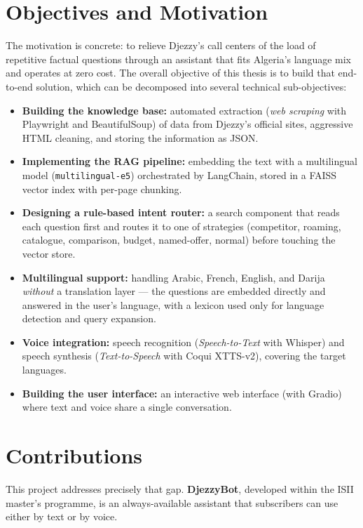 \documentclass[12pt, a4paper]{report}
\newcommand{\humantext}[1]{#1}      %
\begin{document}
\section*{Objectives and Motivation}
\humantext{The motivation is concrete: to relieve Djezzy's call centers of the load of repetitive factual questions through an assistant that fits Algeria's language mix and operates at zero cost. The overall objective of this thesis is to build that end-to-end solution, which can be decomposed into several technical sub-objectives:}
\begin{itemize}
    \item \humantext{\textbf{Building the knowledge base:} automated extraction (\textit{web scraping} with Playwright and BeautifulSoup) of data from Djezzy's official sites, aggressive HTML cleaning, and storing the information as JSON.}
    \item \humantext{\textbf{Implementing the RAG pipeline:} embedding the text with a multilingual model (\texttt{multilingual-e5}) orchestrated by LangChain, stored in a FAISS vector index with per-page chunking.}
    \item \humantext{\textbf{Designing a rule-based intent router:} a search component that reads each question first and routes it to one of \numRoutes{} strategies (competitor, roaming, catalogue, comparison, budget, named-offer, normal) before touching the vector store.}
    \item \humantext{\textbf{Multilingual support:} handling Arabic, French, English, and Darija \emph{without} a translation layer --- the questions are embedded directly and answered in the user's language, with a lexicon used only for language detection and query expansion.}
    \item \humantext{\textbf{Voice integration:} speech recognition (\textit{Speech-to-Text} with Whisper) and speech synthesis (\textit{Text-to-Speech} with Coqui XTTS-v2), covering the target languages.}
    \item \humantext{\textbf{Building the user interface:} an interactive web interface (with Gradio) where text and voice share a single conversation.}
\end{itemize}

\section*{Contributions}
\humantext{This project addresses precisely that gap. \textbf{DjezzyBot}, developed within the ISII master's programme, is an always-available assistant that subscribers can use either by text or by voice.}
\end{document}
